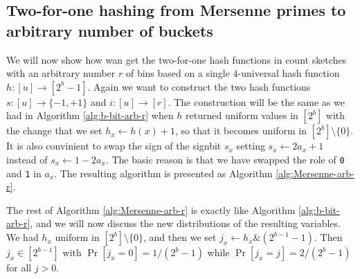 \documentclass[12pt]{article}
\newcommand\fct\rightarrow
\begin{document}
\subsection{Two-for-one hashing from Mersenne primes to arbitrary number of buckets}
We will now show how wan get the two-for-one hash functions in count
sketches with an arbitrary number $r$ of bins based on a single
$4$-universal hash function $h:[u]\fct [2^b-1]$.  Again we want to
construct the two hash functions $s:[u]\fct\{-1,+1\}$ and
$i:[u]\fct[r]$.  The construction will be the same as we had in
Algorithm \ref{alg:b-bit-arb-r} when $h$ returned uniform values in
$[2^b]$ with the change that we set $h_x\gets h(x)+1$, so that it
becomes uniform in $[2^b]\setminus\{0\}$. It is also convinient to
swap the sign of the signbit $s_x$ setting $s_x\gets 2a_x+1$ instead
of $s_x\gets 1-2a_x$. The basic reason is that we have swapped the
role of \texttt{0} and \texttt{1} in $a_x$.  The resulting algorithm
is presented as Algorithm \ref{alg:Mersenne-arb-r}.
The rest of Algorithm \ref{alg:Mersenne-arb-r} is exactly like 
Algorithm \ref{alg:b-bit-arb-r}, and we will now discuss the new
distributions of the resulting variables. We had
$h_x$ uniform in $[2^b]\setminus\{0\}$, and then we set
$j_x \gets h_x\&(2^{b-1}-1)$. Then $j_x\in[2^{b-1}]$ with 
$\Pr[j_x=0]=1/(2^{b}-1)$ while  $\Pr[j_x=j]=2/(2^{b}-1)$ for all $j>0$.
\end{document}
